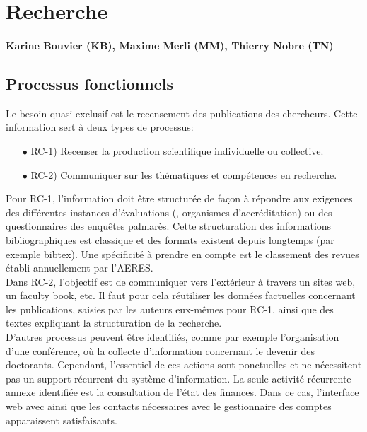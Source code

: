 \documentclass{book}
\begin{document}
\section{Recherche}
\paragraph{Karine Bouvier (KB), Maxime Merli (MM), Thierry Nobre (TN)}

\subsection{Processus fonctionnels}

Le besoin quasi-exclusif est le recensement des publications des chercheurs.
Cette information sert à deux types de processus:
\begin{itemize}
\item[$\bullet$] RC-1) Recenser la production scientifique individuelle ou 
		     collective.
\item[$\bullet$] RC-2) Communiquer sur les thématiques et compétences 
		     en recherche.
\end{itemize}

\bigskip
Pour RC-1, l'information doit être structurée  de façon à répondre aux exigences
des    différentes   instances    d'évaluations   (,    organismes
d'accréditation)   ou  des   questionnaires   des   enquêtes  palmarès.    Cette
structuration  des informations  bibliographiques est  classique et  des formats
existent depuis  longtemps (par  exemple bibtex). Une  spécificité à  prendre en
compte est le classement des revues établi annuellement par l'AERES.\\

Dans RC-2,  l'objectif est de  communiquer vers  l'extérieur à travers  un sites
web, un faculty  book, etc. Il faut pour cela  réutiliser les données factuelles
concernant les publications, saisies par  les auteurs eux-mêmes pour RC-1, ainsi
que des textes expliquant la structuration de la recherche.\\

D'autres  processus peuvent  être identifiés,  comme par  exemple l'organisation
d'une  conférence,  où  la  collecte d'information  concernant  le  devenir  des
doctorants.  Cependant,  l'essentiel  de  ces actions  sont  ponctuelles  et  ne
nécessitent pas un support récurrent du système d'information. La seule activité
récurrente annexe identifiée est la consultation de l'état des finances. Dans ce
cas, l'interface web avec  ainsi que les contacts nécessaires avec
le gestionnaire des comptes apparaissent satisfaisants.
\end{document}
